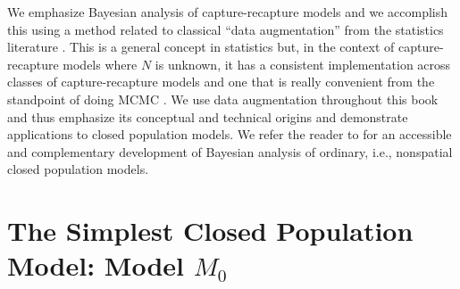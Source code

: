 


We emphasize Bayesian analysis of capture-recapture models and we
accomplish this using a method related to classical ``data
augmentation'' from the statistics literature
\citep[e.g.,][]{tanner_wong:1987}.  This is a general concept in
statistics but, in the context of capture-recapture models where $N$
is unknown, it has a consistent implementation across classes of
capture-recapture models and one that is really convenient from the
standpoint of doing MCMC \citep{royle_etal:2007,royle_dorazio:2012}. We use data
augmentation throughout this book and thus emphasize its conceptual
and technical origins and demonstrate applications to closed
population models.  We refer the reader to
\citet[][ch. 6]{kery_schaub:2011} for an accessible and complementary
development of Bayesian analysis of ordinary, i.e., nonspatial closed population models.


\section{The Simplest Closed Population Model: Model $M_0$}

